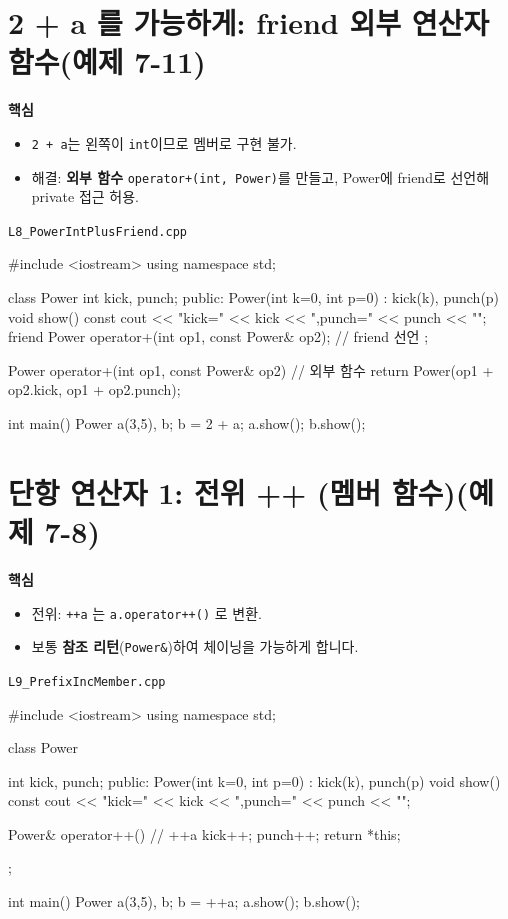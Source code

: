 \documentclass[11pt,a4paper]{article}
\newcommand{\filetag}[1]{\texttt{\color{Accent}#1}}
\begin{document}
\section{2 + a 를 가능하게: friend 외부 연산자 함수(예제 7-11)}
\begin{GoalBox}
\textbf{핵심}
\begin{itemize}[leftmargin=18pt]
  \item \texttt{2 + a}는 왼쪽이 \texttt{int}이므로 멤버로 구현 불가.
  \item 해결: \textbf{외부 함수} \texttt{operator+(int, Power)}를 만들고, Power에 friend로 선언해 private 접근 허용.
\end{itemize}
\end{GoalBox}

\noindent\filetag{L8\_PowerIntPlusFriend.cpp}
\begin{cppcode}
#include <iostream>
using namespace std;

class Power {
    int kick, punch;
public:
    Power(int k=0, int p=0) : kick(k), punch(p) {}
    void show() const { cout << "kick=" << kick << ",punch=" << punch << "\n"; }
    friend Power operator+(int op1, const Power& op2); // friend 선언
};

Power operator+(int op1, const Power& op2) { // 외부 함수
    return Power(op1 + op2.kick, op1 + op2.punch);
}

int main() {
    Power a(3,5), b;
    b = 2 + a;
    a.show();
    b.show();
}
\end{cppcode}

\section{단항 연산자 1: 전위 ++ (멤버 함수)(예제 7-8)}
\begin{GoalBox}
\textbf{핵심}
\begin{itemize}[leftmargin=18pt]
  \item 전위: \texttt{++a} 는 \texttt{a.operator++()} 로 변환.
  \item 보통 \textbf{참조 리턴}(\texttt{Power\&})하여 체이닝을 가능하게 합니다.
\end{itemize}
\end{GoalBox}

\noindent\filetag{L9\_PrefixIncMember.cpp}
\begin{cppcode}
#include <iostream>
using namespace std;

class Power {
    int kick, punch;
public:
    Power(int k=0, int p=0) : kick(k), punch(p) {}
    void show() const { cout << "kick=" << kick << ",punch=" << punch << "\n"; }

    Power& operator++() { // ++a
        kick++; punch++;
        return *this;
    }
};

int main() {
    Power a(3,5), b;
    b = ++a;
    a.show();
    b.show();
}
\end{cppcode}
\end{document}
